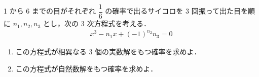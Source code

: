 \documentclass[../../main.tex]{subfiles}
\begin{document}
1 から 6 までの目がそれぞれ $\displaystyle \dfrac{1}{6}$ の確率で出るサイコロを 3 回振って出た目を順に
$n_1, n_2, n_3$ とし，次の 3 次方程式を考える．
\begin{align}
  x^3 - n_1 x + (-1)^{n_2} n_3 = 0
\end{align}
\begin{enumerate}
  \item この方程式が相異なる 3 個の実数解をもつ確率を求めよ．
  \item この方程式が自然数解をもつ確率を求めよ．
\end{enumerate}
\end{document}
